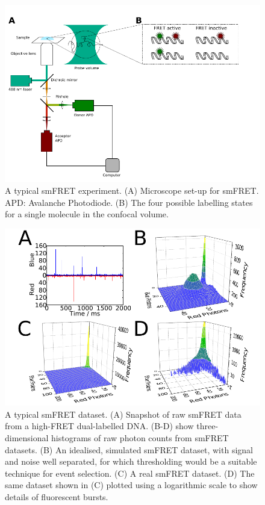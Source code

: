 \begin{figure}[b]
   \begin{center}
      \includegraphics*[width=5in]{inference/S1_diagram_scheme.pdf}
      \caption{A typical smFRET experiment. (A) Microscope set-up for smFRET. APD: Avalanche Photodiode. (B) The four possible labelling states for a single molecule in the confocal volume.}
      \label{fig:schematic}
   \end{center}
\end{figure}


\begin{figure}
   \begin{center}
      \includegraphics*[width=6in]{inference/fig1_intro_graphs.pdf}
      \caption{A typical smFRET dataset. (A) Snapshot of raw smFRET data from a high-FRET dual-labelled DNA. (B-D) show three-dimensional histograms of raw photon counts from smFRET datasets. (B) An idealised, simulated smFRET dataset, with signal and noise well separated, for which thresholding would be a suitable technique for event selection. (C) A real smFRET dataset. (D) The same dataset shown in (C) plotted using a logarithmic scale to show details of fluorescent bursts.}
      \label{fig:figure_diagram_scheme}
   \end{center}
\end{figure}

